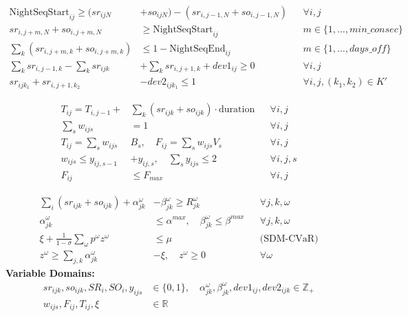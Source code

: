 \documentclass[12pt,a4paper]{article}
\begin{document}
\begin{tcolorbox}[colback=green!5!white, colframe=green!75!black, title=III. Stage 1: Advanced Sequencing \& Penalties]
\begin{align*}
\text{NightSeqStart}_{ij} \geq (sr_{ijN}&+so_{ijN}) - (sr_{i,j-1,N}+so_{i,j-1,N}) && \forall i,j \tag{C10a} \\
sr_{i,j+m,N} + so_{i,j+m,N} &\geq \text{NightSeqStart}_{ij} && m \in \{1, \dots, min\_consec\} \tag{C10b} \\
\sum_k (sr_{i,j+m,k} + so_{i,j+m,k}) &\leq 1 - \text{NightSeqEnd}_{ij} && m \in \{1, \dots, days\_off\} \tag{C11} \\
\sum_k sr_{i,j-1,k} - \sum_k sr_{ijk} &+ \sum_k sr_{i,j+1,k} + dev1_{ij} \geq 0 && \forall i,j \tag{C14} \\
sr_{ijk_1} + sr_{i,j+1,k_2} &- dev2_{ijk_1} \leq 1 && \forall i,j, (k_1,k_2) \in K' \tag{C15}
\end{align*}
\end{tcolorbox}

\begin{tcolorbox}[colback=orange!5!white, colframe=orange!75!black, title=IV. Stage 1: Fatigue Management (NSS Contribution)]
\begin{align*}
T_{ij} = T_{i,j-1} + &\sum_k (sr_{ijk} + so_{ijk}) \cdot \text{duration} && \forall i,j \tag{F1} \\
\sum_s w_{ijs} &= 1 && \forall i,j \tag{F2} \\
T_{ij} = \sum_s w_{ijs}& B_s, \quad F_{ij} = \sum_s w_{ijs} V_s && \forall i,j \tag{F3-4} \\
w_{ijs} \leq y_{ij,s-1} &+ y_{ij,s}, \quad \sum_s y_{ijs} \leq 2 && \forall i,j,s \tag{F5} \\
F_{ij} &\leq F_{max} && \forall i,j \tag{F6}
\end{align*}
\end{tcolorbox}

\begin{tcolorbox}[colback=red!5!white, colframe=red!75!black, title=V. Stage 2 \& Risk Management (CVaR)]
\begin{align*}
\sum_i (sr_{ijk} + so_{ijk}) + \alpha_{jk}^\omega &- \beta_{jk}^\omega \geq R_{jk}^\omega && \forall j,k,\omega \tag{C16} \\
\alpha_{jk}^\omega &\leq \alpha^{max}, \quad \beta_{jk}^\omega \leq \beta^{max} && \forall j,k,\omega \tag{C17-18} \\
\xi + \frac{1}{1-\sigma} \sum_\omega p^\omega z^\omega &\leq \mu && \text{(SDM-CVaR)} \tag{C19} \\
z^\omega \geq \sum_{j,k} \alpha_{jk}^\omega &- \xi, \quad z^\omega \geq 0 && \forall \omega \tag{C20,22}
\end{align*}
\vspace{5pt}
\textbf{Variable Domains:}
\begin{align*}
sr_{ijk}, so_{ijk}, SR_i, SO_i, y_{ijs} &\in \{0,1\}, \quad \alpha_{jk}^\omega, \beta_{jk}^\omega, dev1_{ij}, dev2_{ijk} \in \mathbb{Z}_+ \\
w_{ijs}, F_{ij}, T_{ij}, \xi &\in \mathbb{R}
\end{align*}
\end{tcolorbox}
\end{document}
